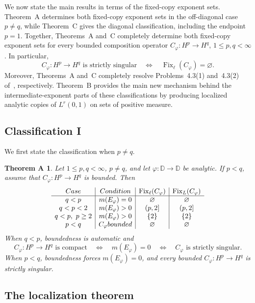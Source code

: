 \documentclass[10pt,a4paper]{amsart}
\newtheorem*{theoremA}{Theorem A}
\newcommand{\D}{\mathbb{D}}
\begin{document}
We now state the main results in terms of the fixed-copy exponent sets.
Theorem~A determines both fixed-copy exponent sets in the
off-diagonal case \(p\ne q\), while Theorem~C gives the diagonal
classification, including the endpoint \(p=1\). Together,
Theorems~A and~C completely determine both fixed-copy exponent sets
for every bounded composition operator
\(C_\varphi:H^p\to H^q\), \(1\le p,q<\infty\). In particular,
\[
        C_\varphi:H^p\to H^q
        \text{ is strictly singular}
        \quad\Longleftrightarrow\quad
        \operatorname{Fix}_{\ell}(C_\varphi)=\varnothing.
\]
Moreover, Theorems~A and~C completely resolve
Problems~4.3\textup{(1)} and~4.3\textup{(2)}
of~\cite{LNST2017}, respectively.
Theorem~B provides the main new mechanism behind the
intermediate-exponent parts of these classifications by producing
localized analytic copies of \(L^r(0,1)\) on sets of positive measure.

\subsection*{Classification I}  We first state the classification when \(p\ne q\).

\begin{theoremA}
Let \(1\le p,q<\infty\),  \(p\ne q\), and let \(\varphi:\D\to\D\) be analytic.  If \(p<q\), assume that
\(C_\varphi:H^p\to H^q\) is bounded.  Then
\[
\begin{array}{c|c|c|c}
\textup{Case}
& \textup{Condition}
& \operatorname{Fix}_{\ell}(C_\varphi)
& \operatorname{Fix}_{L}(C_\varphi)\\
\hline
q<p
& m(E_\varphi)=0
& \varnothing
& \varnothing\\
q<p<2
& m(E_\varphi)>0
& (p,2]
& (p,2]\\
q<p,\ p\ge2
& m(E_\varphi)>0
& \{2\}
& \{2\}\\
p<q
& C_\varphi\textup{ bounded}
& \varnothing
& \varnothing
\end{array}
\]
When \(q<p\), boundedness is automatic and
\[
C_\varphi:H^p\to H^q\text{ is compact}
\quad\Longleftrightarrow\quad
m(E_\varphi)=0
\quad\Longleftrightarrow\quad
C_\varphi\text{ is strictly singular}.
\]
When \(p<q\), boundedness forces \(m(E_\varphi)=0\), and every
bounded \(C_\varphi:H^p\to H^q\) is strictly singular.
\end{theoremA}
 

\subsection*{The localization theorem}
\end{document}
